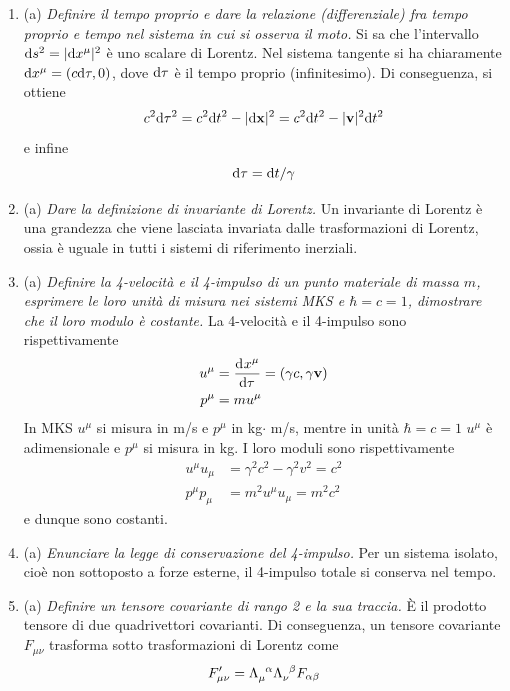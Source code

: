 \documentclass{article}
\renewcommand{\a}{(a)}
\renewcommand{\t}[1]{\textit{ #1}}
\renewcommand{\vec}[1]{\mathbf{#1}}
\begin{document}
\begin{enumerate}
		\[\partial_\mu v^\mu=\frac{1}{c}\pder{v^0}{t}+\nabla\cdot \vec{v}\]
		Se invece $\phi$ è un invariante di Lorentz, il suo differenziale è
		\[\d\phi=\d x^\mu\partial_\mu\phi=\pder{\phi}{t}\d t+(\d \vec{x}\cdot\nabla)\phi\]
		Infine, l'operatore di D'Alembert è
		\[\square=\partial_\mu\partial^\mu=\frac{1}{c^2}\pder[2]{}{t}-\lap\]
		\item\a\t{Definire il tempo proprio e dare la relazione (differenziale) fra tempo proprio e tempo nel sistema in cui si osserva il moto.}
		Si sa che l'intervallo $\mathrm{d} s^2=|\mathrm{d} x^\mu|^2$ è uno scalare di Lorentz. Nel sistema tangente si ha chiaramente $\mathrm{d} x^\mu=(c\mathrm{d}\tau,0)$, dove $\mathrm{d}\tau$ è il tempo proprio (infinitesimo). Di conseguenza, si ottiene
		\[c^2\d\tau^2=c^2\d t^2-|\d \vec{x}|^2=c^2\d t^2-|\vec{v}|^2\d t^2\]
		e infine
		\[\mathrm{d} \tau=\mathrm{d} t/\gamma\]
		\item\a\t{Dare la definizione di invariante di Lorentz.} Un invariante di Lorentz è una grandezza che viene lasciata invariata dalle trasformazioni di Lorentz, ossia è uguale in tutti i sistemi di riferimento inerziali.
		\item\a\t{Definire la 4-velocità e il 4-impulso di un punto materiale di massa $m$, esprimere le loro unità di misura nei sistemi MKS e $\hbar=c=1$, dimostrare che il loro modulo è costante.} La 4-velocità e il 4-impulso sono rispettivamente
		\begin{align*}
			u^\mu&=\der{x^\mu}{\tau}=(\gamma c,\gamma\vec{v})\\p^\mu&=m u^\mu
		\end{align*}
		In MKS $u^\mu$ si misura in m/s e $p^\mu$ in kg$\cdot$ m/s, mentre in unità $\hbar=c=1$ $u^\mu$ è adimensionale e $p^\mu$ si misura in kg. I loro moduli sono rispettivamente
		\begin{align*}
			u^\mu u_\mu&=\gamma^2c^2-\gamma^2v^2=c^2\\
			p^\mu p_\mu&=m^2u^\mu u_\mu=m^2c^2
		\end{align*}
		e dunque sono costanti.
		\item\a\t{Enunciare la legge di conservazione del 4-impulso.} Per un sistema isolato, cioè non sottoposto a forze esterne, il 4-impulso totale si conserva nel tempo.
		\item\a\t{Definire un tensore covariante di rango 2 e la sua traccia.} \`E il prodotto tensore di due quadrivettori covarianti. Di conseguenza, un tensore covariante $F_{\mu\nu}$ trasforma sotto trasformazioni di Lorentz come
		\[F'_{\mu\nu}=\tensor{\Lambda}{_\mu^\alpha}\tensor{\Lambda}{_\nu^\beta}F_{\alpha\beta}\]

\end{enumerate}
\end{document}
